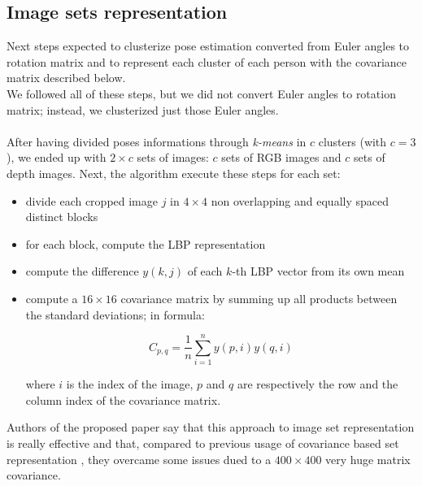 \documentclass{article}
\begin{document}
\subsection{Image sets representation}
\label{sec:covariances}
Next steps expected to clusterize pose estimation converted from Euler angles to
rotation matrix and to represent each cluster of each person with the covariance
matrix described below.
\\
We followed all of these steps, but we did not convert Euler angles to rotation
matrix; instead, we clusterized just those Euler angles.
\\
\\
After having divided poses informations through \textit{k-means} in $c$
clusters (with $c=3$), we ended up with $2\times c$ sets of images: $c$ sets of RGB
images and $c$ sets of depth images. Next, the algorithm execute these steps
for each set:
\begin{itemize}
	\item divide each cropped image $j$ in $4\times 4$ non overlapping and equally
		spaced distinct blocks
	\item for each block, compute the LBP representation
	\item compute the difference $y(k, j)$ of each $k$-th LBP vector from
		its own mean
	\item compute a $16\times16$ covariance matrix by summing up all products
		between the standard deviations; in formula:

		$$
		C_{p, q} = \frac{1}{n} \sum_{i=1}^n y(p, i)y(q, i)
		$$

		where $i$ is the index of the image, $p$ and $q$ are
		respectively the row and the column index of the covariance
		matrix.
\end{itemize}
Authors of the proposed paper say that this approach to image set representation
is really effective and that, compared to previous usage of covariance based set
representation \citep{Dai2012}, they overcame some issues dued to a $400\times 400$
very huge matrix covariance.
\end{document}
